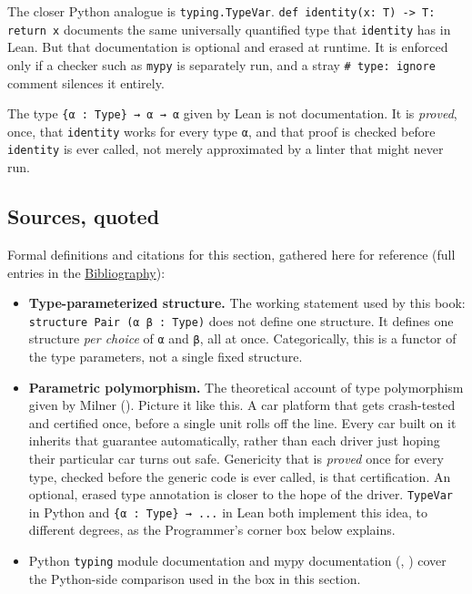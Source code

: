 The closer Python analogue is \texttt{typing.TypeVar}. \texttt{def identity(x: T) -\allowbreak{}> T: return x} documents the same universally quantified type that \texttt{identity} has in Lean. But that documentation is optional and erased at runtime. It is enforced only if a checker such as \texttt{mypy} is separately run, and a stray \texttt{\# type: ignore} comment silences it entirely.

The type \texttt{\{α : Type\} → α → α} given by Lean is not documentation. It is \emph{proved}, once, that \texttt{identity} works for every type \texttt{α}, and that proof is checked before \texttt{identity} is ever called, not merely approximated by a linter that might never run.

\subsection{Sources, quoted}\label{sec:02-functions-and-structures:02-type-parameters:2}

Formal definitions and citations for this section, gathered here for reference (full entries in the \hyperref[sec:root:bibliography:1]{Bibliography}):

\begin{itemize}
\tightlist
\item
  \textbf{Type-parameterized structure.} The working statement used by this book: \texttt{structure Pair (α β : Type)} does not define one structure. It defines one structure \emph{per choice} of \texttt{α} and \texttt{β}, all at once. Categorically, this is a functor of the type parameters, not a single fixed structure.
\item
  \textbf{Parametric polymorphism.} The theoretical account of type polymorphism given by Milner (\cite{Milner1978}). Picture it like this. A car platform that gets crash-tested and certified once, before a single unit rolls off the line. Every car built on it inherits that guarantee automatically, rather than each driver just hoping their particular car turns out safe. Genericity that is \emph{proved} once for every type, checked before the generic code is ever called, is that certification. An optional, erased type annotation is closer to the hope of the driver. \texttt{TypeVar} in Python and \texttt{\{α : Type\} → ...} in Lean both implement this idea, to different degrees, as the Programmer's corner box below explains.
\item
  Python \texttt{typing} module documentation and mypy documentation (\cite{PythonTyping}, \cite{MypyDocs}) cover the Python-side comparison used in the box in this section.
\end{itemize}
